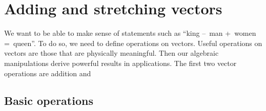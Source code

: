 
\section{Adding and stretching vectors}
\label{sec:asv}
\secttoc


We want to be able to make sense of statements such as ``king --~man +~women =~queen''.
To do so, we need to define operations on vectors.
Useful operations on vectors are those that are physically meaningful.
Then our algebraic manipulations derive powerful results in applications.
The first two vector operations are addition and 


\subsection{Basic operations}

